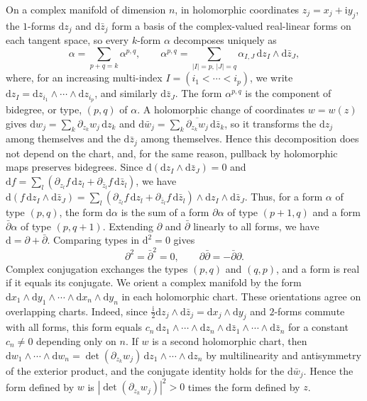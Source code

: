 On a complex manifold of dimension $n$, in holomorphic coordinates $z_j=x_j+\mathrm iy_j$, the $1$-forms $\mathrm dz_j$ and $\mathrm d\bar z_j$ form a basis of the complex-valued real-linear forms on each tangent space, so every $k$-form $\alpha$ decomposes uniquely as
\[
 \alpha=\sum_{p+q=k}\alpha^{p,q},\qquad
 \alpha^{p,q}=\sum_{|I|=p,\,|J|=q}\alpha_{I,J}\,\mathrm{d}z_I\wedge\mathrm{d}\bar z_J,
\]
where, for an increasing multi-index $I=(i_1<\cdots<i_p)$, we write $\mathrm{d}z_I=\mathrm{d}z_{i_1}\wedge\cdots\wedge\mathrm{d}z_{i_p}$, and similarly $\mathrm{d}\bar z_J$. The form $\alpha^{p,q}$ is the component of bidegree, or type, $(p,q)$ of $\alpha$. A holomorphic change of coordinates $w=w(z)$ gives $\mathrm dw_j=\sum_k\partial_{z_k}w_j\,\mathrm dz_k$ and $\mathrm d\bar w_j=\sum_k\overline{\partial_{z_k}w_j}\,\mathrm d\bar z_k$, so it transforms the $\mathrm dz_j$ among themselves and the $\mathrm d\bar z_j$ among themselves. Hence this decomposition does not depend on the chart, and, for the same reason, pullback by holomorphic maps preserves bidegrees. Since $\mathrm d(\mathrm dz_I\wedge\mathrm d\bar z_J)=0$ and $\mathrm df=\sum_l(\partial_{z_l}f\,\mathrm dz_l+\partial_{\bar z_l}f\,\mathrm d\bar z_l)$, we have $\mathrm d(f\,\mathrm dz_I\wedge\mathrm d\bar z_J)=\sum_l(\partial_{z_l}f\,\mathrm dz_l+\partial_{\bar z_l}f\,\mathrm d\bar z_l)\wedge\mathrm dz_I\wedge\mathrm d\bar z_J$. Thus, for a form $\alpha$ of type $(p,q)$, the form $\mathrm d\alpha$ is the sum of a form $\partial\alpha$ of type $(p+1,q)$ and a form $\bar\partial\alpha$ of type $(p,q+1)$. Extending $\partial$ and $\bar\partial$ linearly to all forms, we have $\mathrm{d}=\partial+\bar\partial$. Comparing types in $\mathrm d^2=0$ gives
\[
 \partial^2=\bar\partial^2=0,\qquad
 \partial\bar\partial=-\bar\partial\partial.
\]
Complex conjugation exchanges the types $(p,q)$ and $(q,p)$, and a form is real if it equals its conjugate. We orient a complex manifold by the form $\mathrm{d}x_1\wedge\mathrm{d}y_1\wedge\cdots\wedge\mathrm{d}x_n\wedge\mathrm{d}y_n$ in each holomorphic chart. These orientations agree on overlapping charts. Indeed, since $\frac{\mathrm i}2\mathrm dz_j\wedge\mathrm d\bar z_j=\mathrm dx_j\wedge\mathrm dy_j$ and $2$-forms commute with all forms, this form equals $c_n\,\mathrm dz_1\wedge\cdots\wedge\mathrm dz_n\wedge\mathrm d\bar z_1\wedge\cdots\wedge\mathrm d\bar z_n$ for a constant $c_n\neq0$ depending only on $n$. If $w$ is a second holomorphic chart, then $\mathrm dw_1\wedge\cdots\wedge\mathrm dw_n=\det(\partial_{z_k}w_j)\,\mathrm dz_1\wedge\cdots\wedge\mathrm dz_n$ by multilinearity and antisymmetry of the exterior product, and the conjugate identity holds for the $\mathrm d\bar w_j$. Hence the form defined by $w$ is $|\det(\partial_{z_k}w_j)|^2>0$ times the form defined by $z$.

